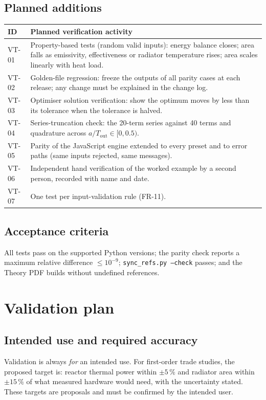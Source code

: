 \documentclass[11pt]{article}
\begin{document}
\subsection{Planned additions}
\begin{longtable}{>{\ttfamily}p{}p{}}
\toprule
ID & Planned verification activity \\
\midrule
\endhead
VT-01 & Property-based tests (random valid inputs): energy balance closes; area falls as emissivity, effectiveness or radiator temperature rises; area scales linearly with heat load. \\
VT-02 & Golden-file regression: freeze the outputs of all parity cases at each release; any change must be explained in the change log. \\
VT-03 & Optimiser solution verification: show the optimum moves by less than its tolerance when the tolerance is halved. \\
VT-04 & Series-truncation check: the 20-term series against 40 terms and quadrature across $a/T_\text{out}\in[0,0.5)$. \\
VT-05 & Parity of the JavaScript engine extended to every preset and to error paths (same inputs rejected, same messages). \\
VT-06 & Independent hand verification of the worked example by a second person, recorded with name and date. \\
VT-07 & One test per input-validation rule (FR-11). \\
\bottomrule
\end{longtable}

\subsection{Acceptance criteria}
All tests pass on the supported Python versions; the parity check reports a maximum
relative difference $\le10^{-9}$; \texttt{sync\_refs.py --check} passes; and the Theory PDF
builds without undefined references.

\section{Validation plan}\label{sec:val}
\subsection{Intended use and required accuracy}
Validation is always \emph{for} an intended use. For first-order trade studies, the
proposed target is: reactor thermal power within $\pm5\,\%$ and radiator area within
$\pm15\,\%$ of what measured hardware would need, with the uncertainty stated. These
targets are proposals and must be confirmed by the intended user.
\end{document}
